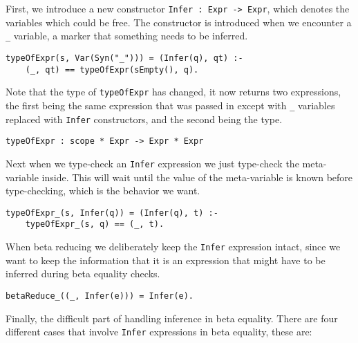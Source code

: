 First, we introduce a new constructor \verb|Infer : Expr -> Expr|, which denotes the variables which could be free. The constructor is introduced when we encounter a \verb|_| variable, a marker that something needs to be inferred.
\begin{lstlisting}
typeOfExpr(s, Var(Syn("_"))) = (Infer(q), qt) :-
	(_, qt) == typeOfExpr(sEmpty(), q).
\end{lstlisting}

Note that the type of \verb|typeOfExpr| has changed, it now returns two expressions, the first being the same expression that was passed in except with \verb|_| variables replaced with \verb|Infer| constructors, and the second being the type.
\begin{lstlisting}
typeOfExpr : scope * Expr -> Expr * Expr
\end{lstlisting}

Next when we type-check an \verb|Infer| expression we just type-check the meta-variable inside. This will wait until the value of the meta-variable is known before type-checking, which is the behavior we want.
\begin{lstlisting}
typeOfExpr_(s, Infer(q)) = (Infer(q), t) :-
	typeOfExpr_(s, q) == (_, t).
\end{lstlisting}

When beta reducing we deliberately keep the \verb|Infer| expression intact, since we want to keep the information that it is an expression that might have to be inferred during beta equality checks.
\begin{lstlisting}
betaReduce_((_, Infer(e))) = Infer(e).
\end{lstlisting}

Finally, the difficult part of handling inference in beta equality. There are four different cases that involve \verb|Infer| expressions in beta equality, these are:

